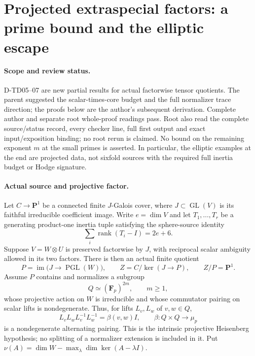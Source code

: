 \section{Projected extraspecial factors: a prime bound and the elliptic escape}
\label{sec:projected-extraspecial}

\paragraph{Scope and review status.}
D-TD05--07 are new partial results for actual factorwise tensor quotients.
The parent suggested the scalar-times-core budget and the full normalizer
trace direction; the proofs below are the author's subsequent derivation.
Complete author and separate root whole-proof readings pass. Root also read the complete source/status record, every checker line, full first output and exact input/exposition binding; no root rerun is claimed.  No bound on the
remaining exponent $m$ at the small primes is asserted.  In particular,
the elliptic examples at the end are projected data, not sixfold sources
with the required full inertia budget or Hodge signature.

\paragraph{Actual source and projective factor.}
Let $C\to\mathbf P^1$ be a connected finite $J$-Galois cover, where
$J\subset\operatorname{GL}(V)$ is its faithful irreducible coefficient image.  Write
$e=\dim V$ and let $T_1,\ldots,T_r$ be a generating product-one inertia
tuple satisfying the sphere-source identity
\[
                 \sum_i\operatorname{rank}(T_i-I)=2e+6.
                 \tag{TDE.1}
\]
Suppose $V=W\otimes U$ is preserved factorwise by $J$, with reciprocal
scalar ambiguity allowed in its two factors.  There is then an actual
finite quotient
\[
        P=\operatorname{im}\bigl(J\longrightarrow\operatorname{PGL}(W)\bigr),
        \qquad Z=C/\ker(J\to P),
        \qquad Z/P=\mathbf P^1.
        \tag{TDE.2}
\]
Assume $P$ contains and normalizes a subgroup
\[
 Q\simeq (\mathbf F_p)^{2m},\qquad m\ge1,
 \tag{TDE.3}
\]
whose projective action on $W$ is irreducible and whose commutator pairing
on scalar lifts is nondegenerate.  Thus, for lifts $L_v,L_w$ of $v,w\in Q$,
\[
 L_vL_wL_v^{-1}L_w^{-1}=\beta(v,w)I,
 \qquad \beta:Q\times Q\longrightarrow\mu_p
 \tag{TDE.4}
\]
is a nondegenerate alternating pairing.  This is the intrinsic
projective Heisenberg hypothesis; no splitting of a normalizer extension
is included in it.  Put
$\nu(A)=\dim W-\max_\lambda\dim\ker(A-\lambda I)$.

